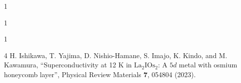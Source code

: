 \begin{招待講演}{1}
\end{招待講演}

\begin{招待論文}{1}
\end{招待論文}

\begin{受賞}{1}
\end{受賞}


\begin{雑誌論文}{4}
H. Ishikawa, T. Yajima, D. Nishio-Hamane, S. Imajo, K. Kindo, and M. Kawamura,
``Superconductivity at 12 K in ${\mathrm{La}}_{2}{\mathrm{IOs}}_{2}$: A $5d$ metal with osmium honeycomb layer'',
Physical Review Materials \textbf{7}, 054804 (2023).

\end{雑誌論文}

